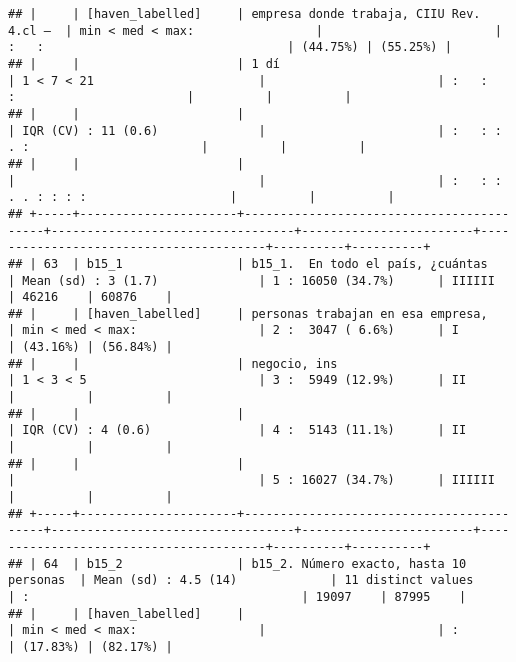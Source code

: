 \documentclass[]{article}
\begin{document}
\begin{verbatim}
## |     | [haven_labelled]     | empresa donde trabaja, CIIU Rev. 4.cl –  | min < med < max:                 |                        | :   :                                  | (44.75%) | (55.25%) |
## |     |                      | 1 dí                                     | 1 < 7 < 21                       |                        | :   :         :                        |          |          |
## |     |                      |                                          | IQR (CV) : 11 (0.6)              |                        | :   : :     . :                        |          |          |
## |     |                      |                                          |                                  |                        | :   : : . . : : : :                    |          |          |
## +-----+----------------------+------------------------------------------+----------------------------------+------------------------+----------------------------------------+----------+----------+
## | 63  | b15_1                | b15_1.  En todo el país, ¿cuántas        | Mean (sd) : 3 (1.7)              | 1 : 16050 (34.7%)      | IIIIII                                 | 46216    | 60876    |
## |     | [haven_labelled]     | personas trabajan en esa empresa,        | min < med < max:                 | 2 :  3047 ( 6.6%)      | I                                      | (43.16%) | (56.84%) |
## |     |                      | negocio, ins                             | 1 < 3 < 5                        | 3 :  5949 (12.9%)      | II                                     |          |          |
## |     |                      |                                          | IQR (CV) : 4 (0.6)               | 4 :  5143 (11.1%)      | II                                     |          |          |
## |     |                      |                                          |                                  | 5 : 16027 (34.7%)      | IIIIII                                 |          |          |
## +-----+----------------------+------------------------------------------+----------------------------------+------------------------+----------------------------------------+----------+----------+
## | 64  | b15_2                | b15_2. Número exacto, hasta 10 personas  | Mean (sd) : 4.5 (14)             | 11 distinct values     | :                                      | 19097    | 87995    |
## |     | [haven_labelled]     |                                          | min < med < max:                 |                        | :                                      | (17.83%) | (82.17%) |

\end{verbatim}
\end{document}
